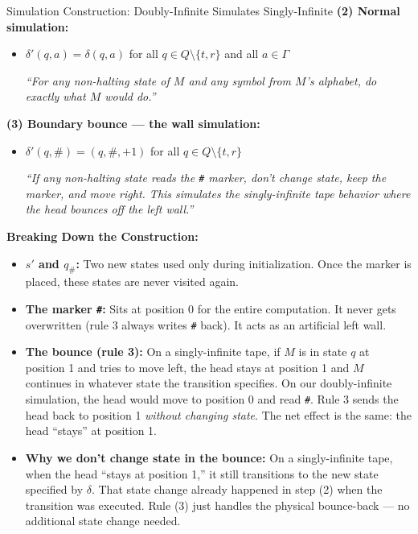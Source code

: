 \begin{definitionbox}{{Simulation Construction: Doubly-Infinite Simulates Singly-Infinite}}
\textbf{(2) Normal simulation:}
\begin{itemize}[nosep]
\item $\delta'(q, a) = \delta(q, a)$ for all $q \in Q \setminus \{t, r\}$
  and all $a \in \Gamma$

  \textit{``For any non-halting state of $M$ and any symbol from $M$'s
  alphabet, do exactly what $M$ would do.''}
\end{itemize}

\textbf{(3) Boundary bounce --- the wall simulation:}
\begin{itemize}[nosep]
\item $\delta'(q, \#) = (q, \#, +1)$ for all $q \in Q \setminus \{t, r\}$

  \textit{``If any non-halting state reads the \texttt{\#} marker, don't
  change state, keep the marker, and move right. This simulates the
  singly-infinite tape behavior where the head bounces off the left wall.''}
\end{itemize}

\textbf{Breaking Down the Construction:}
\begin{itemize}[nosep]
\item \textbf{$s'$ and $q_\#$:} Two new states used only during initialization.
  Once the marker is placed, these states are never visited again.
\item \textbf{The marker \texttt{\#}:} Sits at position 0 for the entire
  computation. It never gets overwritten (rule 3 always writes \texttt{\#}
  back). It acts as an artificial left wall.
\item \textbf{The bounce (rule 3):} On a singly-infinite tape, if $M$ is in
  state $q$ at position 1 and tries to move left, the head stays at position
  1 and $M$ continues in whatever state the transition specifies. On our
  doubly-infinite simulation, the head would move to position 0 and read
  \texttt{\#}. Rule 3 sends the head back to position 1 \emph{without
  changing state}. The net effect is the same: the head ``stays'' at
  position 1.
\item \textbf{Why we don't change state in the bounce:} On a singly-infinite
  tape, when the head ``stays at position 1,'' it still transitions to the
  new state specified by $\delta$. That state change already happened in
  step (2) when the transition was executed. Rule (3) just handles the
  physical bounce-back --- no additional state change needed.
\end{itemize}
\end{definitionbox}

